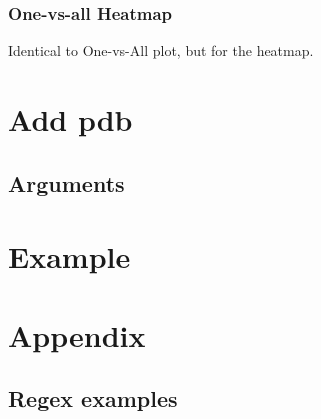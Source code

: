 \documentclass[a4paper,10pt]{article}
\begin{document}
\subsubsection{One-vs-all Heatmap}

Identical to One-vs-All plot, but for the heatmap.

\section{Add pdb} \label{add_p}

\subsection{Arguments}

\section{Example} \label{example}

\section{Appendix} \label{appendix}

\subsection{Regex examples}

% 
% 
% 
% 
% 
% 
% 
% 
\end{document}
